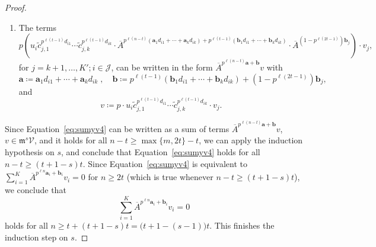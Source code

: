 \documentclass[10pt,a4paper]{amsart}
\newcommand{\ba}{\boldsymbol{a}}
\newcommand{\bb}{\boldsymbol{b}}
\newcommand{\frm}{\mathfrak{m}}
\newcommand{\mJ}{\mathcal{J}}
\newcommand{\mV}{\mathcal{V}}
\newcommand{\oA}{\overline{A}}
\newcommand{\tc}{\widetilde{c}}
\begin{document}
\begin{proof}
\begin{enumerate}[nosep, label=(\roman*)]
    the terms $\oA^{p^{\ell n} \ba_i + \bb_i} w_i, i = 1, \ldots, k$, can be written in the form $\oA^{p^{\ell (n-t)} \ba + \bb} v$, with
    \[
    \ba \coloneqq (p^{\ell n} - p^{\ell (n-t)}) \ba_i \;, \quad \bb \coloneqq \bb_i \;, \quad v \coloneqq w_i.
    \]
    Similarly, the terms $\oA^{p^{\ell n} \ba_i + \bb_i} v_i, i = K'+1, \ldots, K$, can be written in the form $\oA^{p^{\ell (n-t)} \ba + \bb} v$.
    \item
    The terms
    \[
    p \left( u_{i} \tc_{j,1}^{p^{\ell (t-1)}d_{i1}} \cdots \tc_{j,k}^{p^{\ell (t-1)} d_{ik}} \cdot \oA^{p^{\ell (n-t)}(\ba_1 d_{i1} + \cdots + \ba_k d_{ik}) + p^{\ell (t-1)} (\bb_1 d_{i1} + \cdots + \bb_k d_{ik})} \cdot \oA^{(1 - p^{\ell (2t-1)}) \bb_j} \right) \cdot v_j,
    \]
    for $j = k+1, \ldots, K'; i \in \mJ$,
    can be written in the form $\oA^{p^{\ell (n-t)} \ba + \bb} v$ with
    \[
    \ba \coloneqq \ba_1 d_{i1} + \cdots + \ba_k d_{ik} \;, \quad \bb \coloneqq p^{\ell (t-1)} (\bb_1 d_{i1} + \cdots + \bb_k d_{ik}) + (1 - p^{\ell (2t-1)}) \bb_j,
    \]
    and
    \[
    v \coloneqq p \cdot u_{i} \tc_{j,1}^{p^{\ell (t-1)}d_{i1}} \cdots \tc_{j,k}^{p^{\ell (t-1)} d_{ik}} \cdot v_j.
    \]
    \end{enumerate}
    
    Since Equation~\eqref{eq:sumyv4} can be written as a sum of terms $\oA^{p^{\ell (n-t)} \ba + \bb} v$, $v \in \frm^s \mV$, and it holds for all $n - t \geq \max\{m, 2t\} - t$, we can apply the induction hypothesis on $s$, and conclude that Equation~\eqref{eq:sumyv4} holds for all $n - t \geq (t+1-s)t$.
    Since Equation~\eqref{eq:sumyv4} is equivalent to $\sum_{i = 1}^K \oA^{p^{\ell n} \ba_i + \bb_i} v_i = 0$ for $n \geq 2t$ (which is true whenever $n - t \geq (t+1-s)t$), we conclude that 
    \[
    \sum_{i = 1}^K \oA^{p^{\ell n} \ba_i + \bb_i} v_i = 0
    \]
    holds for all $n \geq t+ (t+1-s)t = \big(t+1 - (s-1)\big) t$.
    This finishes the induction step on $s$.
\end{proof}
\end{document}
